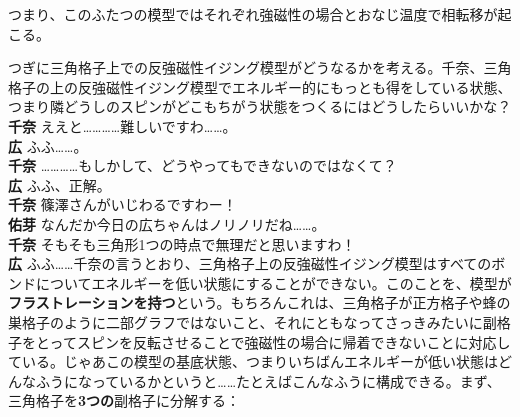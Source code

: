 \documentclass[paper=b5j,fontsize=12Q,jafontsize=12Q,baselineskip=21Q]{jlreq}
\DeclareRobustCommand{\hiron}{\textbf{広 }}
\DeclareRobustCommand{\chinan}{\textbf{千奈 }}
\DeclareRobustCommand{\umen}{\textbf{佑芽 }}
\begin{document}
\begin{refsection}
\begin{center}
\end{center}

つまり、このふたつの模型ではそれぞれ強磁性の場合とおなじ温度で相転移が起こる。

つぎに三角格子上での反強磁性イジング模型がどうなるかを考える。千奈、三角格子の上の反強磁性イジング模型でエネルギー的にもっとも得をしている状態、つまり隣どうしのスピンがどこもちがう状態をつくるにはどうしたらいいかな？
\\\chinan ええと…………難しいですわ……。
\\\hiron ふふ……。
\\\chinan …………もしかして、どうやってもできないのではなくて？
\\\hiron ふふ、正解。
\\\chinan 篠澤さんがいじわるですわー！
\\\umen なんだか今日の広ちゃんはノリノリだね……。
\\\chinan そもそも三角形1つの時点で無理だと思いますわ！
\\\hiron ふふ……千奈の言うとおり、三角格子上の反強磁性イジング模型はすべてのボンドについてエネルギーを低い状態にすることができない。このことを、模型が\textbf{フラストレーションを持つ}という。もちろんこれは、三角格子が正方格子や蜂の巣格子のように二部グラフではないこと、それにともなってさっきみたいに副格子をとってスピンを反転させることで強磁性の場合に帰着できないことに対応している。じゃあこの模型の基底状態、つまりいちばんエネルギーが低い状態はどんなふうになっているかというと……たとえばこんなふうに構成できる。まず、三角格子を\textbf{3つの}副格子に分解する：


\end{refsection}
\end{document}
